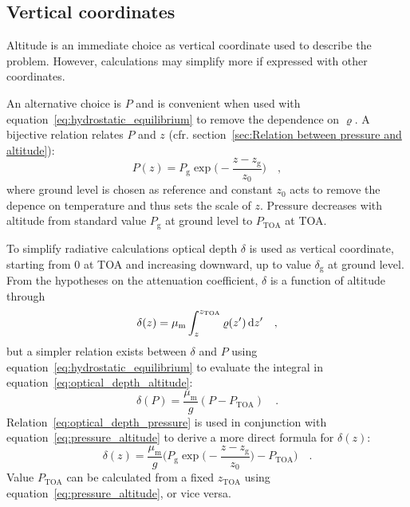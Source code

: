 \documentclass[a4paper,10pt,twocolumn,\classoptions]{article}
\newcommand{\zTOA}{z_\text{TOA}}
\newcommand{\PTOA}{P_\text{TOA}}
\begin{document}
\subsection{Vertical coordinates}
\label{sec:Vertical coordinates}
Altitude is an immediate choice as vertical coordinate used to describe the problem. However, calculations may simplify more if expressed with other coordinates.

An alternative choice is $P$ and is convenient when used with equation~\eqref{eq:hydrostatic_equilibrium} to remove the dependence on $\varrho$. A bijective relation relates $P$ and $z$ (cfr. section~\ref{sec:Relation between pressure and altitude}):
\begin{equation}
  \label{eq:pressure_altitude}
  P(z) = P_\text{g} \exp{\bigg( - \frac{z - z_\text{g}}{z_0} \bigg)}
  \quad ,
\end{equation}
where ground level is chosen as reference and constant $z_0$ acts to remove the depence on temperature and thus sets the scale of $z$. Pressure decreases with altitude from standard value $P_\text{g}$ at ground level to $\PTOA$ at TOA.

To simplify radiative calculations optical depth $\delta$ is used as vertical coordinate, starting from \num{0} at TOA and increasing downward, up to value $\delta_\text{g}$ at ground level. From the hypotheses on the attenuation coefficient, $\delta$ is a function of altitude through
\begin{equation}
  \label{eq:optical_depth_altitude}
  \delta(z) = \mu_\text{m} \int_{z}^{\zTOA} \varrho(z') \odif{z'}
  \quad ,
\end{equation}
but a simpler relation exists between $\delta$ and $P$ using equation~\eqref{eq:hydrostatic_equilibrium} to evaluate the integral in equation~\eqref{eq:optical_depth_altitude}:
\begin{equation}
  \label{eq:optical_depth_pressure}
  \delta(P) = \frac{\mu_\text{m}}{g} (P - \PTOA)
  \quad .
\end{equation}
Relation~\eqref{eq:optical_depth_pressure} is used in conjunction with equation~\eqref{eq:pressure_altitude} to derive a more direct formula for $\delta(z)$:
\begin{equation}
  \label{eq:optical_depth_altitude_2}
  \delta(z) = \frac{\mu_\text{m}}{g} \bigg( P_\text{g} \exp{\bigg( - \frac{z - z_\text{g}}{z_0} \bigg)} - \PTOA \bigg)
  \quad .
\end{equation}
Value $\PTOA$ can be calculated from a fixed $\zTOA$ using equation~\eqref{eq:pressure_altitude}, or vice versa.
\end{document}
